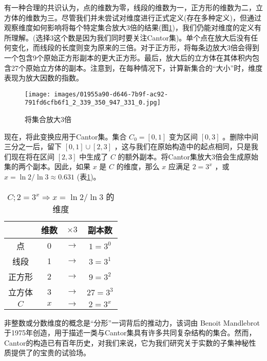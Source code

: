 有一种合理的共识认为，点的维数为零，线段的维数为一，正方形的维数为二，立方体的维数为三。尽管我们并未尝试对维度进行正式定义(存在多种定义)，但通过观察维度如何影响将每个特定集合放大3倍的结果(图\ref{fig:3.2})，我们仍能对维度的定义有所理解。(选择$3$这个数是因为我们同时要关注Cantor集)。单个点在放大后没有任何变化，而线段的长度则变为原来的三倍。对于正方形，将每条边放大3倍会得到一个包含9个原始正方形副本的更大正方形。最后，放大后的立方体在其体积内包含27个原始立方体的副本。注意到，在每种情况下，计算新集合的“大小”时，维度表现为放大因数的指数。


\begin{figure}[t]
  \centering
  \texttt{[image: images/01955a90-d646-7b9f-ac92-791fd6cfb6f1\_2\_339\_350\_947\_331\_0.jpg]}
  \caption{将集合放大3倍}
  \label{fig:3.2}
\end{figure}


现在，将此变换应用于Cantor集。集合 \({C}_{0} = \left\lbrack  {0,1}\right\rbrack\) 变为区间 \(\left\lbrack  {0,3}\right\rbrack\) 。删除中间三分之一后，留下 \(\left\lbrack  {0,1}\right\rbrack   \cup  \left\lbrack  {2,3}\right\rbrack\) ，这与我们在原始构造中的起点相同，只是我们现在将在区间 \(\left\lbrack  {2,3}\right\rbrack\) 中生成了 \(C\) 的额外副本。将Cantor集放大$3$倍会生成原始集的两个副本。因此，如果 \(x\) 是 \(C\) 的维度，那么 \(x\) 应满足 \(2 = {3}^{x}\) ，或 \(x = \ln 2/\ln 3 \approx  {0.631}\) (表\ref{fig:3.3})。


\begin{table}[t]
  \centering
\begin{tabular}{|c|c|c|c|}
\hline
 & 维数 & $\times3$ & 副本数 \\
\hline
点 & 0 & $\to$ & $1 = 3^{0}$ \\
\hline
线段 & 1 & $\to$ & $3 = 3^{1}$ \\
\hline
正方形 & 2 & $\to$ & $9 = 3^{2}$ \\
\hline
立方体 & 3 & $\to$ & $27 = 3^{3}$ \\
\hline
$C$ & $x$ & $\to$ & $2 = 3^{x}$ \\
\hline
\end{tabular}
  \caption{ \(C;2 = {3}^{x} \Rightarrow  x = \ln 2/\ln 3\) 的维度}
  \label{fig:3.3}
\end{table}


非整数或分数维度的概念是“分形”一词背后的推动力，该词由 Benoit Mandlebrot 于1975年创造，用于描述一类与Cantor集具有许多共同复杂结构的集合。然而，Cantor的构造已有百年历史，对我们来说，它为我们研究关于实数的子集神秘性质提供了的宝贵的试验场。

